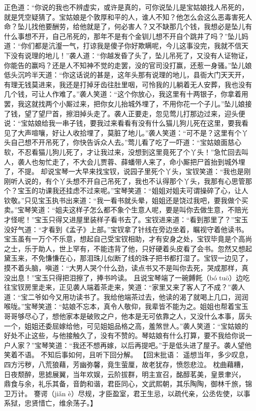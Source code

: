 \documentclass[12pt,oneside]{book}
\begin{document}
正色道：“你说的我也不辨虚实，或许是真的，可你说坠儿是宝姑娘找人吊死的，就是凭空疑猜了。宝姑娘是个敦厚和平的人，谁人不知？他怎么会这么恶毒害死人命？坠儿找他要酬劳，给他就是了，何必害人？又不缺那几个钱，我想必是坠儿有什么事想不开，自己吊死的，那年不是有个金钏儿想不开自个跳井了吗？”坠儿妈道：“你们都是沆瀣一气，打谅我是傻子你好欺瞒呢，今儿这事没完，我就不信天下没有说理的地儿！”袭人道：“你越发昏了头了，坠儿吊死了，又没有人证物证，你能告的赢吗？还是人不知神不觉的走罢，没的官司没打赢，还惹一身骚。”坠儿娘低头沉吟半天道：“你这话说的甚是，这年头那有说理的地儿，县衙大门天天开，有理无钱莫进来，我还是打掉牙齿往肚里咽，可怜我的儿躺着无人安葬，我也没有几个钱，可让人作难了。”袭人笑道：“这个你放心，我这里有十两银子，你拿着用罢，我这就找两个小厮过来，把你女儿抬城外埋了，不用你花一个子儿。”坠儿娘接了钱，望了望尸首，擦泪掉头走了。袭人正要走，忽见莺儿打那边过来，迎头便说：“宝姑娘给我一串子钱，要我过来看看有没有什么猫儿狗儿死在这里，要我看见了大声喧嚷，好让人收拾埋了，莫脏了地儿。”袭人笑道：“可不是？这里有个丫头自己想不开吊死了，你快告诉众人去。”莺儿看了吃了一吓道：“宝姑娘面慈心软，不忍看猫儿狗儿死了，才让我过来，没想到这里竟死了个丫头！”急忙回去叫人，袭人也匆忙走了，不大会儿贾蓉、薛蟠带人来了，命小厮把尸首抬到城外埋了，不提。
却说宝琴一大早来找宝钗，说园子里死个丫头，宝钗笑道：“我也是刚刚听人说的，有个丫头想不开自己吊死了，我也不认得那个丫头，我那有心思管那个？宝玉的功课我还挂虑不过来呢。”宝琴笑道：“姐姐对姐夫可谓操碎了心，让人钦敬。”只见宝玉执书出来道：“我一看书就头晕，姐姐还是饶过我吧，要我做个买卖。”宝琴笑道：“姐夫这样子怎么都不象个生意人呢，要是叫你去做生意，不赔光才怪呢！”宝玉只得又进屋里装样子看书去了。宝钗进来道：“看到那里了？”宝玉没好气道：“才看到《孟子》上部。”宝钗拿了针线在旁边坐着，瞩视守着他读书。
宝玉虽有一万个不乐意，想起自己受宝钗相助，才有安身之处，宝钗毕竟是个高尚之士，乐于助人，世上罕有，不能违背了他，只好硬着头皮看了会书。忽然又想起黛玉来，不免慊慊在心，那泪珠儿似断了线的珠子把书都打湿了。宝钗一边见了，摸不着头脑，嗔道：“大男人哭个什么劲，读点书又不是叫你去死，哭成那样，真没出息！”宝玉只得把泪擦了，捧书吟读。
且说宝琴端了一碗餺飥（bó tuō）边吃往宝钗房里走来，正见袭人端着茶走来，笑道：“家里又来了客人了不成？”袭人道：“宝二爷如今又用功读书了。我给他端茶过去，他读的渴了就喝上几口，润润喉咙。”宝琴笑道：“姑娘不忘本，真令人敬仰，我辈皆不能为之。姐姐也帮着宝玉哥哥够尽心了，想他家本是破败之户，他本是无可依靠之人，又没什么本事，孱头一个，姐姐还委屈嫁给他，可见姐姐品格之高，羞煞世人。”袭人笑道：“宝姑娘的好处不止这些，与他接触久了，没有不赞的。琴姑娘有什么打算，要不我给你说一户人家？”宝琴笑道：“我还不想再嫁，以后再提吧。”于是低头进了屋子。袭人望他笑着不语。
不知后事如何，且听下回分解。
【回末批语：
遥想当年，多少叹息，四方污秽，八荒狼藉，芳幽弥馨，竟生萤厘，故老犹存，愤怨悲泣。
枕曲藉糟，日夜颓醉，思摅展翼，当年欢娱，云阶拔群，明主宣召，酩醇茗美，皇景聿兴，
鼎食与余，礼乐其备，音韵和谐，君臣同心，文武熙朝，其乐陶陶，御林千旅，锦卫万计。
謇谔（jiǎn è）尽规，才臣盈室，君王生忌，以疏代亲，公丞佐使，以事系狱，忠贤惜亡，维余荡子。】
\end{document}
